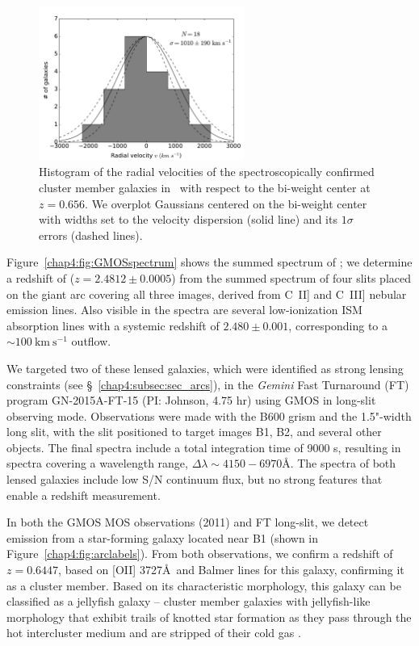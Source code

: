 \begin{figure}
\centering
\includegraphics[width=0.6\textwidth]{Chap4/c4f1.pdf}
\caption[Radial velocities of cluster members in \cluster]{Histogram of the radial velocities of the spectroscopically confirmed cluster member galaxies in \cluster\ with respect to the bi-weight center at $z=0.656$. We overplot Gaussians centered on the bi-weight center with widths set to the velocity dispersion (solid line) and its $1\sigma$ errors (dashed lines).}
\label{chap4:fig:vel_hist}
\end{figure}

Figure~\ref{chap4:fig:GMOSspectrum} shows the summed spectrum of \giantarc; we determine a redshift of ($z = 2.4812 \pm0.0005$) from the summed spectrum of four slits placed on the giant arc covering all three images, derived from C~II] and C~III] nebular emission lines. Also visible in the spectra are several low-ionization ISM absorption lines with a systemic redshift of $2.480\pm 0.001$, corresponding to a $\sim100\ \mathrm{km\ s^{-1}}$ outflow.

We targeted two of these lensed galaxies, which were identified as strong lensing constraints (see \S~\ref{chap4:subsec:sec_arcs}), in the \textit{Gemini} Fast Turnaround (FT) program GN-2015A-FT-15 (PI: Johnson, 4.75 hr) using GMOS in long-slit observing mode. Observations were made with the B600 grism and the 1.5"-width long slit, with the slit positioned to target images B1, B2, and several other objects. The final spectra include a total integration time of 9000 s, resulting in spectra covering a wavelength range, $\Delta \lambda \sim 4150-6970$\AA. The spectra of both lensed galaxies include low S/N continuum flux, but no strong features that enable a redshift measurement.

In both the GMOS MOS observations (2011) and FT long-slit, we detect emission from a star-forming galaxy located near B1 (shown in Figure~\ref{chap4:fig:arclabels}). From both observations, we confirm a redshift of $z=0.6447$, based on [OII] 3727\AA\ and Balmer lines for this galaxy, confirming it as a cluster member. Based on its characteristic morphology, this galaxy can be classified as a jellyfish galaxy -- cluster member galaxies with jellyfish-like morphology that exhibit trails of knotted star formation as they pass through the hot intercluster medium and are stripped of their cold gas \citep{Ebeling:2014rf,Suyu:2010xy}.

